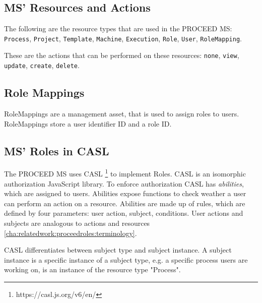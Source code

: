 \subsection{MS' Resources and Actions}
\label{cha:relatedwork:proceedroles:ms-resources-actions}

The following are the resource types that are used in the PROCEED MS:
\lstinline{Process},
\lstinline{Project},
\lstinline{Template},
\lstinline{Machine},
\lstinline{Execution},
\lstinline{Role},
\lstinline{User},
\lstinline{RoleMapping}.

These are the actions that can be performed on these resources:
\lstinline{none},
\lstinline{view},
\lstinline{update},
\lstinline{create},
\lstinline[keywords={}]{delete}.

\subsection{Role Mappings}
\label{cha:relatedwork:proceedroles:role-mappings}

RoleMappings are a management asset, that is used to assign roles to users.
RoleMappings store a user identifier ID and a role ID.

\subsection{MS' Roles in CASL}
\label{cha:relatedwork:proceedroles:casl}

The PROCEED MS uses CASL \footnote{https://casl.js.org/v6/en/} to implement Roles. 
CASL is an isomorphic authorization JavaScript library.
To enforce authorization CASL has \textit{abilities}, which are assigned to users.
Abilities expose functions to check weather a user can perform an action on a resource.
Abilities are made up of rules, which are defined by four parameters: user action, subject,
conditions.
User actions and subjects are analogous to actions and resources \ref{cha:relatedwork:proceedroles:terminology}.

CASL differentiates between subject type and subject instance.
A subject instance is a specific instance of a subject type, e.g. a specific process
users are working on, is an instance of the resource type "Process".


